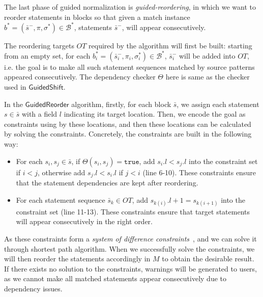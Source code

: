 \documentclass[a4paper, USenglish]{lipics-v2016}
\theoremstyle{plain}
\begin{document}
The last phase of guided normalization is \emph{guided-reordering}, in which we want to reorder statements in blocks so that given a match instance $b^*=(\bar{s}^-,\pi,\sigma^*)\in \mathcal{B}^*$, statements $\bar{s}^-$, will appear consecutively. 

The reordering targets $\mathit{OT}$ required by the algorithm will first be built: starting from an empty set, for each $b_i^*=(\bar{s}_i^-, \pi_i,\sigma^*_i)\in \mathcal{B}^*$, $\bar{s}_i^-$ will be added into $\mathit{OT}$, i.e. the goal is to make all such statement sequences matched by source patterns appeared consecutively. The dependency checker $\Theta$ here is same as the checker used in $\mathsf{GuidedShift}$.

In the $\mathsf{GuidedReorder}$ algorithm, firstly, for each block $\bar{s}$, we assign each statement $s\in\bar{s}$ with a field $l$ indicating its target location. Then, we encode the goal as constraints using by these locations, and then these locations can be calculated by solving the constraints. Concretely, the constraints are built in the following way:
\begin{itemize}
\item For each $s_i,s_j\in\bar{s}$, if $\Theta(s_i, s_j)=\mathtt{true}$, add $s_i.l < s_j.l$ into the constraint set if $i<j$, otherwise add $s_j.l < s_i.l$ if $j < i$ (line 6-10). These constraints ensure that the statement dependencies are kept after reordering. 
\item For each statement sequence $\bar{s}_k\in \mathit{OT}$, add $s_{k(i)}.l + 1= s_{k(i+1)}$ into the constraint set (line 11-13). These constraints ensure that target statements will appear consecutively in the right order.
\end{itemize}

As these constraints form a \emph{system of difference constraints}~\cite{Cormen:2001:IA:580470}, and we can solve it through shortest path algorithm. When we successfully solve the constraints, we will then reorder the statements accordingly in $M$ to obtain the desirable result. If there exists no solution to the constraints, warnings will be generated to users, as we cannot make all matched statements appear consecutively due to dependency issues.
\end{document}
